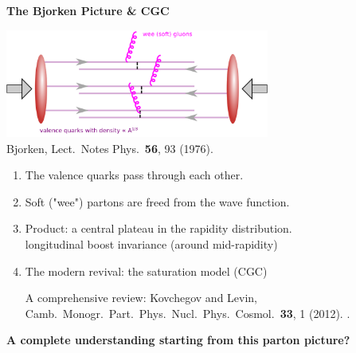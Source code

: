 \documentclass[9pt,a4paper,unknownkeysallowed,xcolor=dvipsnames,aspectratio=43]{beamer}
\begin{document}
\begin{frame}{\bf\huge The Bjorken Picture \& CGC}	\vspace{4mm}
\begin{center}
\includegraphics[width=0.65\textwidth]{fig/Bjorken}\\
{\tiny  {\color{teablue}
Bjorken,
  Lect.\ Notes Phys.\  {\bf 56}, 93 (1976).
  }}
\end{center}
\begin{enumerate}
\item{\large The valence quarks pass through each other.}
\vspace{2mm}
\item{\large Soft ("wee") partons are freed from the wave function.}
\vspace{2mm}
\item{\large Product: a central plateau in the rapidity distribution.}\\
\vspace{1mm}
    longitudinal boost invariance (around mid-rapidity)
\vspace{1mm}
\item{\large The modern revival: the saturation model (CGC)}
\begin{center}
    {\tiny  A comprehensive review: {\color{teablue}
  Kovchegov and Levin,
  Camb.\ Monogr.\ Part.\ Phys.\ Nucl.\ Phys.\ Cosmol.\  {\bf 33}, 1 (2012).
.
  }}
\end{center}
\end{enumerate}
\vspace{1mm}
\begin{center}
{\bf\large\color{darkred} A complete understanding starting from this parton picture?}
\end{center}

\end{frame}
\end{document}
